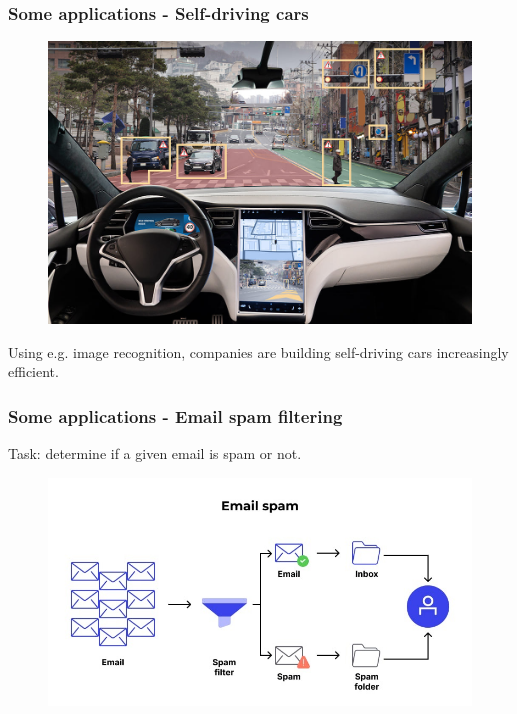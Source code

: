 \documentclass{beamer}
\begin{document}
	\begin{frame}
		\frametitle{Some applications - Self-driving cars}
		\begin{figure}
			\centering
			\includegraphics[scale=0.3]{images/self-driving-1}
		\end{figure}
		Using e.g. image recognition, companies are building self-driving cars increasingly efficient.
		
	\end{frame}

	\begin{frame}
		\frametitle{Some applications - Email spam filtering}
		Task: determine if a given email is spam or not.
		\begin{figure}
			\centering
			\includegraphics[scale=0.5]{images/spam-filtering-1}
		\end{figure}
	\end{frame}
\end{document}
